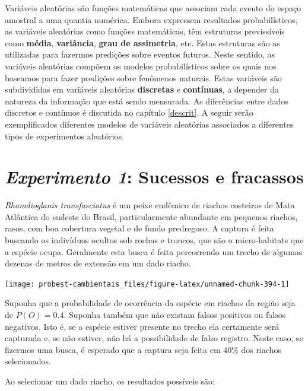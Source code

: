 \documentclass[
]{book}
\begin{document}
Variáveis aleatórias são funções matemáticas que associam cada evento do espaço amostral a uma quantia numérica. Embora expressem resultados probabilísticos, as variáveis aleatórias como funções matemáticas, têm estruturas previssíveis como \textbf{média}, \textbf{variância}, \textbf{grau de assimetria}, etc. Estas estruturas são as utilizadas para fazermos predições sobre eventos futuros. Neste sentido, as variáveis aleatórias compõem os modelos probabilísticos sobre os quais nos baseamos para fazer predições sobre fenômenos naturais. Estas variáveis são subdivididas em variáveis aleatórias \textbf{discretas} e \textbf{contínuas}, a depender da natureza da informação que está sendo mensurada. As diferências entre dados discretos e contínuos é discutida no capítulo \ref{descrit}. A seguir serão exemplificados diferentes modelos de variáveis aleatórias associados a diferentes tipos de experimentos aleatórios.

\hypertarget{experimento-1-sucessos-e-fracassos}{%
\section{\texorpdfstring{\emph{Experimento 1}: Sucessos e fracassos}{Experimento 1: Sucessos e fracassos}}\label{experimento-1-sucessos-e-fracassos}}

\emph{Rhamdioglanis transfasciatus} é um peixe endêmico de riachos costeiros de Mata Atlântica do sudeste do Brasil, particularmente abundante em pequenos riachos, rasos, com boa cobertura vegetal e de fundo predregoso. A captura é feita buscando os indivíduos ocultos sob rochas e troncos, que são o micro-habitats que a espécie ocupa. Geralmente esta busca é feita percorrendo um trecho de algumas dezenas de metros de extensão em um dado riacho.

\begin{center}\texttt{[image: probest-cambientais\_files/figure-latex/unnamed-chunk-394-1]} \end{center}

Suponha que a probabilidade de ocorrência da espécie em riachos da região seja de \(P(O) = 0.4\). Suponha também que não existam falsos positivos ou falsos negativos. Isto é, se a espécie estiver presente no trecho ela certamente será capturada e, se não estiver, não há a possibilidade de falso registro. Neste caso, se fizermos uma busca, é esperado que a captura seja feita em 40\% dos riachos selecionados.

Ao selecionar um dado riacho, os resultados possíveis são:
\end{document}
